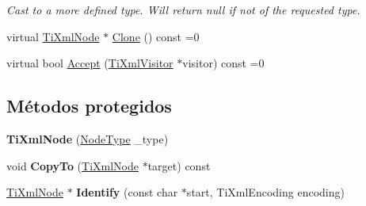 \begin{DoxyCompactItemize}
\begin{DoxyCompactList}\small\item\em \-Cast to a more defined type. \-Will return null if not of the requested type. \end{DoxyCompactList}\item 
virtual \hyperlink{classTiXmlNode}{\-Ti\-Xml\-Node} $\ast$ \hyperlink{classTiXmlNode_a4508cc3a2d7a98e96a54cc09c37a78a4}{\-Clone} () const =0
\item 
virtual bool \hyperlink{classTiXmlNode_acc0f88b7462c6cb73809d410a4f5bb86}{\-Accept} (\hyperlink{classTiXmlVisitor}{\-Ti\-Xml\-Visitor} $\ast$visitor) const =0
\end{DoxyCompactItemize}
\subsection*{\-Métodos protegidos}
\begin{DoxyCompactItemize}
\item 
\hypertarget{classTiXmlNode_a3f46721695868667113c7487ff123f20}{{\bfseries \-Ti\-Xml\-Node} (\hyperlink{classTiXmlNode_a836eded4920ab9e9ef28496f48cd95a2}{\-Node\-Type} \-\_\-type)}\label{classTiXmlNode_a3f46721695868667113c7487ff123f20}

\item 
\hypertarget{classTiXmlNode_ab6056978923ad8350fb5164af32d8038}{void {\bfseries \-Copy\-To} (\hyperlink{classTiXmlNode}{\-Ti\-Xml\-Node} $\ast$target) const }\label{classTiXmlNode_ab6056978923ad8350fb5164af32d8038}

\item 
\hypertarget{classTiXmlNode_ac1e3a8e7578be463b04617786120c2bb}{\hyperlink{classTiXmlNode}{\-Ti\-Xml\-Node} $\ast$ {\bfseries \-Identify} (const char $\ast$start, \-Ti\-Xml\-Encoding encoding)}\label{classTiXmlNode_ac1e3a8e7578be463b04617786120c2bb}

\end{DoxyCompactItemize}
